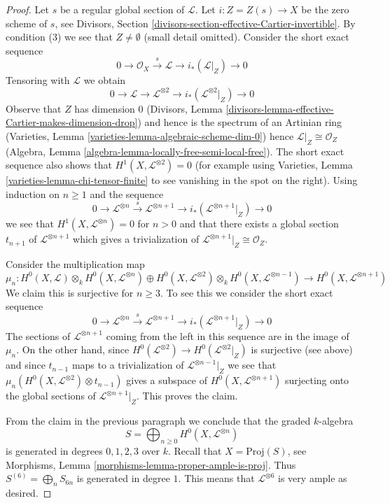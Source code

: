 \documentclass[10pt,a4paper]{amsart}
\theoremstyle{plain}
\theoremstyle{definition}
\theoremstyle{remark}
\numberwithin{equation}{subsection}
\begin{document}
\begin{proof}
Let $s$ be a regular global section of $\mathcal{L}$. Let
$i : Z = Z(s) \to X$ be the zero scheme of $s$, see
Divisors, Section \ref{divisors-section-effective-Cartier-invertible}.
By condition (3) we see that $Z \not = \emptyset$ (small detail omitted).
Consider the short exact sequence
$$
0 \to \mathcal{O}_X \xrightarrow{s} \mathcal{L} \to
i_*(\mathcal{L}|_Z) \to 0
$$
Tensoring with $\mathcal{L}$ we obtain
$$
0 \to \mathcal{L} \to \mathcal{L}^{\otimes 2} \to
i_*(\mathcal{L}^{\otimes 2}|_Z) \to 0
$$
Observe that $Z$ has dimension $0$
(Divisors, Lemma \ref{divisors-lemma-effective-Cartier-makes-dimension-drop})
and hence is the spectrum of an Artinian ring
(Varieties, Lemma \ref{varieties-lemma-algebraic-scheme-dim-0})
hence $\mathcal{L}|_Z \cong \mathcal{O}_Z$
(Algebra, Lemma \ref{algebra-lemma-locally-free-semi-local-free}).
The short exact sequence also shows that
$H^1(X, \mathcal{L}^{\otimes 2}) = 0$ (for example using
Varieties, Lemma \ref{varieties-lemma-chi-tensor-finite}
to see vanishing in the spot on the right). Using induction
on $n \geq 1$ and the sequence
$$
0 \to \mathcal{L}^{\otimes n} \xrightarrow{s}
\mathcal{L}^{\otimes n + 1} \to
i_*(\mathcal{L}^{\otimes n + 1}|_Z) \to 0
$$
we see that $H^1(X, \mathcal{L}^{\otimes n}) = 0$ for $n > 0$
and that there exists a global section $t_{n + 1}$
of $\mathcal{L}^{\otimes n + 1}$ which gives a trivialization of
$\mathcal{L}^{\otimes n + 1}|_Z \cong \mathcal{O}_Z$.

\medskip\noindent
Consider the multiplication map
$$
\mu_n :
H^0(X, \mathcal{L}) \otimes_k H^0(X, \mathcal{L}^{\otimes n})
\oplus
H^0(X, \mathcal{L}^{\otimes 2}) \otimes_k H^0(X, \mathcal{L}^{\otimes n - 1})
\longrightarrow
H^0(X, \mathcal{L}^{\otimes n + 1})
$$
We claim this is surjective for $n \geq 3$.
To see this we consider the short exact sequence
$$
0 \to \mathcal{L}^{\otimes n} \xrightarrow{s}
\mathcal{L}^{\otimes n + 1} \to i_*(\mathcal{L}^{\otimes n + 1}|_Z) \to 0
$$
The sections of $\mathcal{L}^{\otimes n + 1}$ coming from the left in this
sequence are in the image of $\mu_n$. On the other hand, since
$H^0(\mathcal{L}^{\otimes 2}) \to H^0(\mathcal{L}^{\otimes 2}|_Z)$
is surjective (see above) and since $t_{n - 1}$ maps to a trivialization of
$\mathcal{L}^{\otimes n - 1}|_Z$
we see that $\mu_n(H^0(X, \mathcal{L}^{\otimes 2}) \otimes t_{n - 1})$
gives a subspace
of $H^0(X, \mathcal{L}^{\otimes n + 1})$ surjecting onto the global sections of
$\mathcal{L}^{\otimes n + 1}|_Z$. This proves the claim.

\medskip\noindent
From the claim in the previous paragraph we conclude
that the graded $k$-algebra
$$
S = \bigoplus\nolimits_{n \geq 0} H^0(X, \mathcal{L}^{\otimes n})
$$
is generated in degrees $0, 1, 2, 3$ over $k$.
Recall that $X = \text{Proj}(S)$, see
Morphisms, Lemma \ref{morphisms-lemma-proper-ample-is-proj}.
Thus $S^{(6)} = \bigoplus_{n} S_{6n}$ is generated in degree $1$.
This means that $\mathcal{L}^{\otimes 6}$ is very ample as desired.
\end{proof}
\end{document}
